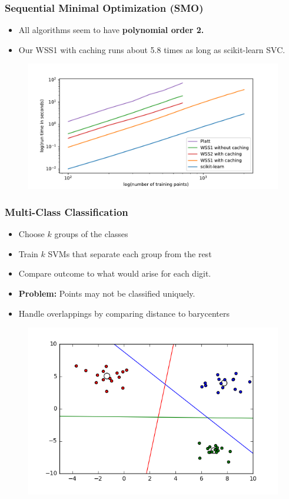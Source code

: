 \documentclass[12pt, compress]{beamer}
\newcommand{\titleC}{Sequential Minimal Optimization (SMO)}
\newcommand{\titleD}{Multi-Class Classification}
\begin{document}
\begin{frame}
\frametitle{\titleC}
\begin{itemize}
	\item All algorithms seem to have \textbf{\alert{polynomial order 2.}}
	\item Our WSS1 with caching runs about 5.8 times as long as scikit-learn SVC.
\end{itemize}
\begin{figure}[h]
	\includegraphics[width=1\textwidth]{images_for_presentation/benchplot_gauss_loglog.pdf}
\end{figure}
\end{frame}
          

\begin{frame}
  \frametitle{\titleD}
	\begin{itemize}
		\item Choose $k$ groups of the classes
		\item Train $k$ SVMs that separate each group from the rest
		\item Compare outcome to what would arise for each digit.
		\item \textbf{\alert{Problem:}} Points may not be classified uniquely.
		\item Handle overlappings by comparing distance to barycenters
	\end{itemize}

	\begin{figure}[h]
		\includegraphics[width=.6\textwidth]{onevsall_examplegraphic}
	\end{figure}
\end{frame}
\end{document}
